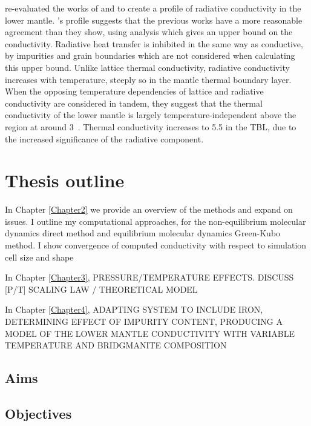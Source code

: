 \citet{Tang2014} re-evaluated the works of \citet{Keppler2008} and \citet{Goncharov2008} to create a profile of radiative conductivity in the lower mantle. \citeauthor{Tang2014}'s profile suggests that the previous works have a more reasonable agreement than they show, using analysis which gives an upper bound on the conductivity. Radiative heat transfer is inhibited in the same way as conductive, by impurities and grain boundaries which are not considered when calculating this upper bound. Unlike lattice thermal conductivity, radiative conductivity increases with temperature, steeply so in the mantle thermal boundary layer. When the opposing temperature dependencies of lattice and radiative conductivity are considered in tandem, they suggest that the thermal conductivity of the lower mantle is largely temperature-independent above the \ddds region at around 3~\wmk. Thermal conductivity increases to 5.5 \wmks in the TBL, due to the increased significance of the radiative component.





\section{Thesis outline}
In Chapter \ref{Chapter2} we provide an overview of the methods and expand on issues. I outline my computational approaches, for the non-equilibrium molecular dynamics direct method and equilibrium molecular dynamics Green-Kubo method. I show convergence of computed conductivity with respect to simulation cell size and shape 

In Chapter \ref{Chapter3}, PRESSURE/TEMPERATURE EFFECTS. DISCUSS [P/T] SCALING LAW / THEORETICAL MODEL

In Chapter \ref{Chapter4}, ADAPTING SYSTEM TO INCLUDE IRON, DETERMINING EFFECT OF IMPURITY CONTENT, PRODUCING A MODEL OF THE LOWER MANTLE CONDUCTIVITY WITH VARIABLE TEMPERATURE AND BRIDGMANITE COMPOSITION

\subsection{Aims}

\subsection{Objectives}


